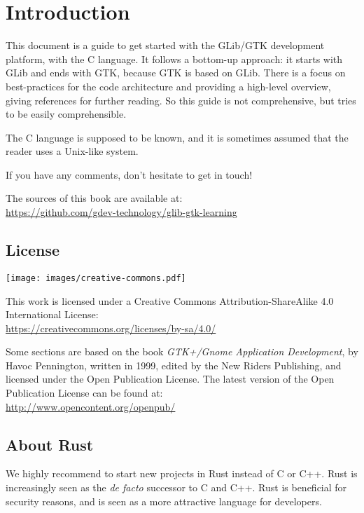 \chapter{Introduction}

This document is a guide to get started with the GLib/GTK development platform, with the C language. It follows a bottom-up approach: it starts with GLib and ends with GTK, because GTK is based on GLib. There is a focus on best-practices for the code architecture and providing a high-level overview, giving references for further reading. So this guide is not comprehensive, but tries to be easily comprehensible.

The C language is supposed to be known, and it is sometimes assumed that the reader uses a Unix-like system.

If you have any comments, don't hesitate to get in touch!

The sources of this book are available at:\\
\url{https://github.com/gdev-technology/glib-gtk-learning}

\section{License}
\label{intro-license}

\begin{center}
  \texttt{[image: images/creative-commons.pdf]}
\end{center}

This work is licensed under a Creative Commons Attribution-ShareAlike 4.0 International License:\\
\url{https://creativecommons.org/licenses/by-sa/4.0/}

Some sections are based on the book \emph{GTK+/Gnome Application Development}, by Havoc Pennington, written in 1999, edited by the New Riders Publishing, and licensed under the Open Publication License. The latest version of the Open Publication License can be found at:\\
\url{http://www.opencontent.org/openpub/}

\section{About Rust}

We highly recommend to start new projects in Rust instead of C or C++. Rust is increasingly seen as the \emph{de facto} successor to C and C++. Rust is beneficial for security reasons, and is seen as a more attractive language for developers.

